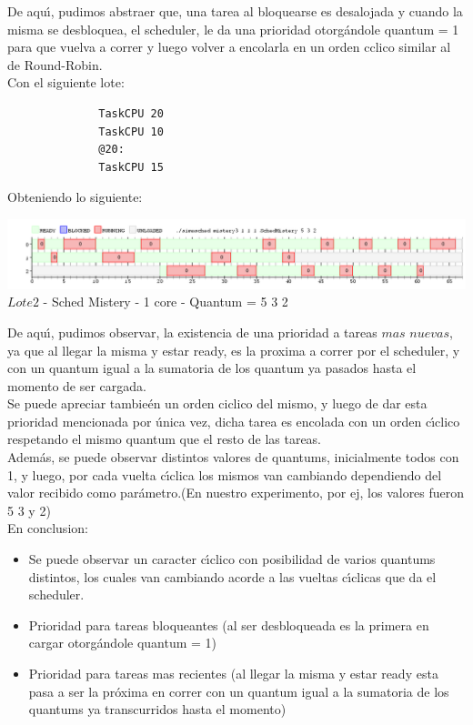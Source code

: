 De aqu\'{\i}, pudimos abstraer que, una tarea al bloquearse es desalojada y cuando la misma se desbloquea, el scheduler, le da
una prioridad otorg\'{a}ndole quantum = 1 para que vuelva a correr y luego volver a encolarla en un orden cclico similar al de Round-Robin.\\

Con el siguiente lote:\\

\begin{verbatim}
              TaskCPU 20
              TaskCPU 10
              @20:
              TaskCPU 15
\end{verbatim}

Obteniendo lo siguiente:\\
\begin{center}
    	\includegraphics[width=450pt]{./Test/ej7_3.png}
	{$Lote 2$ - Sched Mistery - 1 core - Quantum = 5 3 2}	
 \end{center}
 
De aqu\'{\i}, pudimos observar, la existencia de una prioridad a tareas $mas$ $nuevas$, ya que al llegar la misma y estar ready, es
la proxima a correr por el scheduler, y con un quantum igual a la sumatoria de los quantum ya pasados hasta el momento de ser cargada.\\
Se puede apreciar tambie\'{e}n un orden ciclico del mismo, y luego de dar esta prioridad mencionada por \'{u}nica vez, dicha tarea es encolada con un orden c\'{\i}clico
respetando el mismo quantum que el resto de las tareas.\\
Adem\'{a}s, se puede observar distintos valores de quantums, inicialmente todos con 1, y luego, por cada vuelta c\'{\i}clica los mismos van cambiando dependiendo del valor recibido
como par\'{a}metro.(En nuestro experimento, por ej, los valores fueron 5 3 y 2)\\

\indent En conclusion:\\


\begin{itemize}
 \item Se puede observar un caracter c\'{\i}clico con posibilidad de varios quantums distintos, los cuales van cambiando
 acorde a las vueltas c\'{\i}clicas que da el scheduler.
 \item Prioridad para tareas bloqueantes (al ser desbloqueada es la primera en cargar otorg\'{a}ndole quantum = 1)
 \item Prioridad para tareas mas recientes (al llegar la misma y estar ready esta pasa a ser la pr\'{o}xima en correr con un quantum igual
 a la sumatoria de los quantums ya transcurridos hasta el momento)
\end{itemize}

